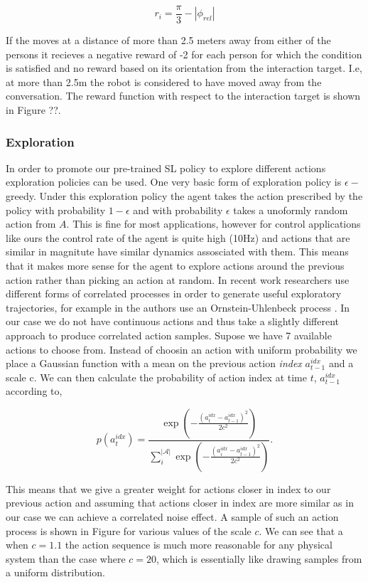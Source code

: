 \documentclass[a4paper,11pt]{report}
\begin{document}
\begin{equation}
	r_i = \frac{\pi}{3} -|\phi_{rel}| 
\end{equation}

If the moves at a distance of more than 2.5 meters away from either of the persons it recieves a negative reward of -2 for each person for which the condition is satisfied and no reward based on its orientation from the interaction target. I.e, at more than 2.5m the robot is considered to have moved away from the conversation. The reward function with respect to the interaction target is shown in Figure ??.

\subsubsection{Exploration}
In order to promote our pre-trained SL policy to explore different actions exploration policies can be used. One very basic form of exploration policy is $\epsilon-$greedy. Under this exploration policy the agent takes the action prescribed by the policy with probability $1-\epsilon$ and with probability $\epsilon$ takes a unoformly random action from $A$. This is fine for most applications, however for control applications like ours the control rate of the agent is quite high (10Hz) and actions that are similar in magnitute have similar dynamics assosciated with them. This means that it makes more sense for the agent to explore actions around the previous action rather than picking an action at random. In recent work researchers use different forms of correlated processes in order to generate useful exploratory trajectories, for example in \cite{lillicrap2015continuous} the authors use an  Ornstein-Uhlenbeck process \cite{uhlenbeck1930theory}. In our case we do not have continuous actions and thus take a slightly different approach to produce correlated action samples. Supose we have 7 available actions to choose from. Instead of choosin an action with uniform probability we place a Gaussian function with a mean on the previous action \emph{index} $a^{idx}_{t-1}$ and a scale c. We can then calculate the probability of action index at time $t$, $a^{idx}_{t-1}$ according to,   


\begin{equation}
	p(a^{idx}_t) =\frac{\exp(-\frac{(a^{idx}_t-a^{idx}_{t-1})^2}{2c^2})}{\sum_i^{|\mathcal{A}|} \exp(-\frac{(a^{idx}_i-a^{idx}_{t-1})^2}{2c^2}) }.
\end{equation}

This means that we give a greater weight for actions closer in index to our previous action and assuming that actions closer in index are more similar as in our case we can achieve a correlated noise effect. A sample of such an action process is shown in Figure for various values of the scale $c$. We can see that a when $c=1.1$ the action sequence is much more reasonable for any physical system than the case where $c=20$, which is essentially like drawing samples from a uniform distribution. 
\end{document}
